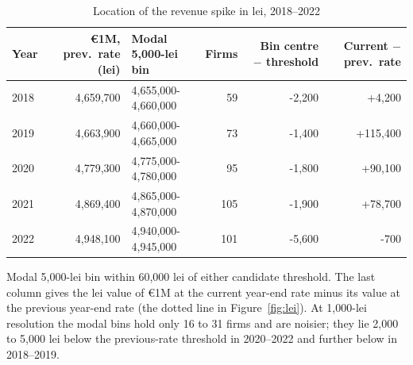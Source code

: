 \begin{table}[!tbp]\centering
\footnotesize
\caption{Location of the revenue spike in lei, 2018--2022}\label{tab:lei}
\setlength{\tabcolsep}{3.5pt}
\begin{tabular}{lrlrrr}\toprule
Year & \euro{}1M, prev.\ rate (lei) & Modal 5,000-lei bin & Firms & Bin centre $-$ threshold & Current $-$ prev.\ rate \\ \midrule
2018 & 4,659,700 & 4,655,000-4,660,000 & 59 & -2,200 & +4,200 \\
2019 & 4,663,900 & 4,660,000-4,665,000 & 73 & -1,400 & +115,400 \\
2020 & 4,779,300 & 4,775,000-4,780,000 & 95 & -1,800 & +90,100 \\
2021 & 4,869,400 & 4,865,000-4,870,000 & 105 & -1,900 & +78,700 \\
2022 & 4,948,100 & 4,940,000-4,945,000 & 101 & -5,600 & -700 \\
\bottomrule\end{tabular}
\begin{minipage}{0.95\linewidth}\vspace{2pt}\footnotesize Modal 5,000-lei bin within 60,000 lei of either candidate threshold. The last column gives the lei value of \euro{}1M at the current year-end rate minus its value at the previous year-end rate (the dotted line in Figure~\ref{fig:lei}). At 1,000-lei resolution the modal bins hold only 16 to 31 firms and are noisier; they lie 2,000 to 5,000 lei below the previous-rate threshold in 2020--2022 and further below in 2018--2019.\end{minipage}
\end{table}